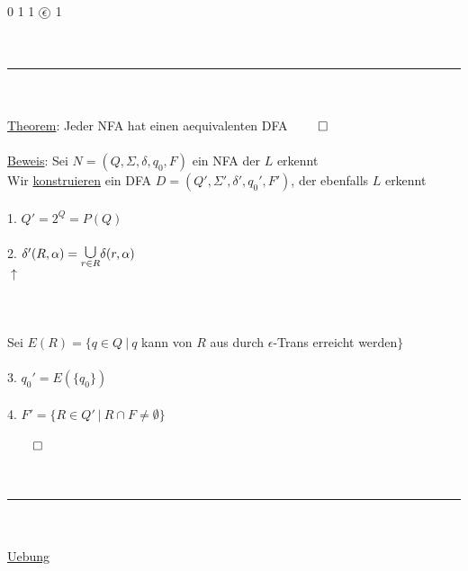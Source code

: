 \documentclass[18pt,a4paper]{scrreprt}
\newcommand*\circled[1]{\tikz[baseline=(char.base)]{
            \node[shape=circle,draw,inner sep=1pt] (char) {#1};}}
\newcommand{\tab}{\hspace*{2em}}
\begin{document}
\tab\tab 0 \tab 1 \tab\: \tab 1 \tab\: \textcolor{red}{$\circled{\textcolor{black}{$\epsilon$}}$} \tab 1 \tab\:\\
\\
\\
\rule{\textwidth}{0.4mm}\\
\\
\uline{Theorem}: Jeder NFA hat einen aequivalenten DFA $\qed$\\
\\
\uline{Beweis}: Sei $N = (Q, \Sigma, \delta, q_0, F)$ ein NFA der $L$ erkennt\\
Wir \uline{konstruieren} ein DFA $D = (Q', \Sigma', \delta', q_0', F')$, der ebenfalls $L$ erkennt\\
\\
1. $Q' = 2^Q = P(Q)$\\
\\
2. $\delta'(R,\alpha) = \underset{r \in R}{\scalebox{1.5}{$\cup$}}{\delta(r,\alpha)}$\\
\tab\: $\uparrow $\\
\tab \scalebox{0.8}{$\in Q'$}\\
\\
\\
Sei $E(R) = \{ q \in Q \:\vert\: q$ kann von $R$ aus durch $\epsilon$-Trans erreicht werden$\}$\\
\\
3. $q_0' = E(\{q_0\})$\\
\\
4. $F' = \{ R \in Q' \:\vert\: R \cap F \neq \emptyset \}$\\
\\
$\qed$\\
\\
\\
\rule{\textwidth}{0.4mm}\\
\\
\uline{Uebung}\\
\end{document}
